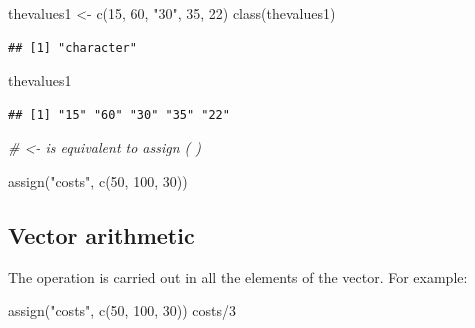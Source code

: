 \documentclass[
]{book}
\newenvironment{Shaded}{\begin{snugshade}}{\end{snugshade}}
\newcommand{\CommentTok}[1]{\textcolor[rgb]{0.56,0.35,0.01}{\textit{#1}}}
\newcommand{\DecValTok}[1]{\textcolor[rgb]{0.00,0.00,0.81}{#1}}
\newcommand{\FunctionTok}[1]{\textcolor[rgb]{0.00,0.00,0.00}{#1}}
\newcommand{\NormalTok}[1]{#1}
\newcommand{\OtherTok}[1]{\textcolor[rgb]{0.56,0.35,0.01}{#1}}
\newcommand{\SpecialCharTok}[1]{\textcolor[rgb]{0.00,0.00,0.00}{#1}}
\newcommand{\StringTok}[1]{\textcolor[rgb]{0.31,0.60,0.02}{#1}}
\begin{document}
\begin{Shaded}
\begin{Highlighting}[]
\NormalTok{thevalues1 }\OtherTok{\textless{}{-}} \FunctionTok{c}\NormalTok{(}\DecValTok{15}\NormalTok{, }\DecValTok{60}\NormalTok{, }\StringTok{"30"}\NormalTok{, }\DecValTok{35}\NormalTok{, }\DecValTok{22}\NormalTok{)}
\FunctionTok{class}\NormalTok{(thevalues1)}
\end{Highlighting}
\end{Shaded}

\begin{verbatim}
## [1] "character"
\end{verbatim}

\begin{Shaded}
\begin{Highlighting}[]
\NormalTok{thevalues1}
\end{Highlighting}
\end{Shaded}

\begin{verbatim}
## [1] "15" "60" "30" "35" "22"
\end{verbatim}

\begin{Shaded}
\begin{Highlighting}[]
\CommentTok{\# \textless{}{-}  is equivalent to   assign ( )}

\FunctionTok{assign}\NormalTok{(}\StringTok{"costs"}\NormalTok{, }\FunctionTok{c}\NormalTok{(}\DecValTok{50}\NormalTok{, }\DecValTok{100}\NormalTok{, }\DecValTok{30}\NormalTok{))}
\end{Highlighting}
\end{Shaded}

\hypertarget{vector-arithmetic}{%
\subsection{Vector arithmetic}\label{vector-arithmetic}}

The operation is carried out in all the elements of the vector. For example:

\begin{Shaded}
\begin{Highlighting}[]
\FunctionTok{assign}\NormalTok{(}\StringTok{"costs"}\NormalTok{, }\FunctionTok{c}\NormalTok{(}\DecValTok{50}\NormalTok{, }\DecValTok{100}\NormalTok{, }\DecValTok{30}\NormalTok{))}
\NormalTok{costs}\SpecialCharTok{/}\DecValTok{3}
\end{Highlighting}
\end{Shaded}
\end{document}

